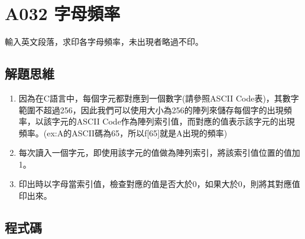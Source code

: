 \section{A032 字母頻率}
輸入英文段落，求印各字母頻率，未出現者略過不印。

\subsection{解題思維}

\begin{enumerate}
	\item
	因為在C語言中，每個字元都對應到一個數字(請參照ASCII Code表)，其數字範圍不超過256，因此我們可以使用大小為256的陣列來儲存每個字的出現頻率，以該字元的ASCII Code作為陣列索引值，而對應的值表示該字元的出現頻率。(ex:A的ASCII碼為65，所以f[65]就是A出現的頻率)
	\item 每次讀入一個字元，即使用該字元的值做為陣列索引，將該索引值位置的值加1。
	\item 印出時以字母當索引值，檢查對應的值是否大於0，如果大於0，則將其對應值印出來。
\end{enumerate} 

\subsection{程式碼}
